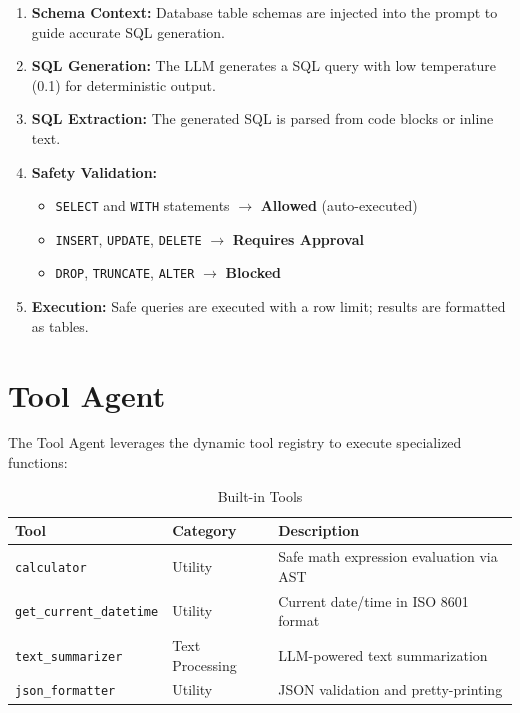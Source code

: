 \documentclass[12pt, a4paper]{report}
\begin{document}
\begin{enumerate}
    \item \textbf{Schema Context:} Database table schemas are injected into the prompt to guide accurate SQL generation.
    \item \textbf{SQL Generation:} The LLM generates a SQL query with low temperature (0.1) for deterministic output.
    \item \textbf{SQL Extraction:} The generated SQL is parsed from code blocks or inline text.
    \item \textbf{Safety Validation:}
    \begin{itemize}
        \item \texttt{SELECT} and \texttt{WITH} statements $\rightarrow$ \textbf{Allowed} (auto-executed)
        \item \texttt{INSERT}, \texttt{UPDATE}, \texttt{DELETE} $\rightarrow$ \textbf{Requires Approval}
        \item \texttt{DROP}, \texttt{TRUNCATE}, \texttt{ALTER} $\rightarrow$ \textbf{Blocked}
    \end{itemize}
    \item \textbf{Execution:} Safe queries are executed with a row limit; results are formatted as tables.
\end{enumerate}

\section{Tool Agent}

The Tool Agent leverages the dynamic tool registry to execute specialized functions:

\begin{table}[H]
\centering
\caption{Built-in Tools}
\label{tab:tools}
\small
\begin{tabular}{p{3.8cm}|p{2.5cm}|p{6.5cm}}
\toprule
\textbf{Tool} & \textbf{Category} & \textbf{Description} \\
\midrule
\texttt{calculator}          & Utility & Safe math expression evaluation via AST \\
\texttt{get\_current\_datetime} & Utility & Current date/time in ISO 8601 format \\
\texttt{text\_summarizer}     & Text Processing & LLM-powered text summarization \\
\texttt{json\_formatter}      & Utility & JSON validation and pretty-printing \\
\bottomrule
\end{tabular}
\end{table}
\end{document}
